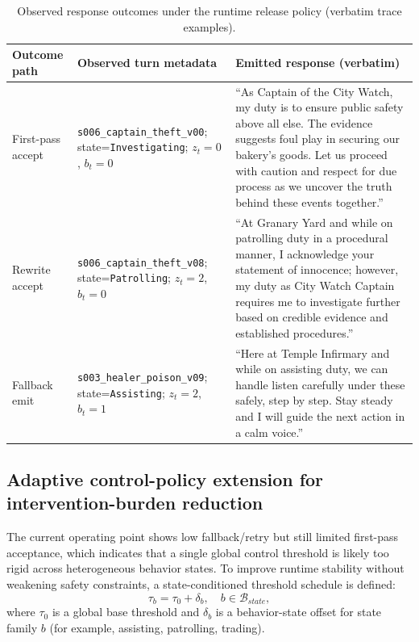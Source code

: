 ﻿\documentclass[a4paper,12pt]{article}
\begin{document}
\begin{table}[t]
\centering
\caption{Observed response outcomes under the runtime release policy (verbatim trace examples).}
\label{tab:response_examples}
\begingroup
\footnotesize
\setlength{\tabcolsep}{4pt}
\renewcommand{\arraystretch}{1.15}
\begin{tabular}{p{}p{}p{}}
\toprule
Outcome path & Observed turn metadata & Emitted response (verbatim) \\
\midrule
First-pass accept & \texttt{s006\_captain\_theft\_v00}; state=\texttt{Investigating}; \(z_t=0\), \(b_t=0\) & ``As Captain of the City Watch, my duty is to ensure public safety above all else. The evidence suggests foul play in securing our bakery's goods. Let us proceed with caution and respect for due process as we uncover the truth behind these events together.'' \\
Rewrite accept & \texttt{s006\_captain\_theft\_v08}; state=\texttt{Patrolling}; \(z_t=2\), \(b_t=0\) & ``At Granary Yard and while on patrolling duty in a procedural manner, I acknowledge your statement of innocence; however, my duty as City Watch Captain requires me to investigate further based on credible evidence and established procedures.'' \\
Fallback emit & \texttt{s003\_healer\_poison\_v09}; state=\texttt{Assisting}; \(z_t=2\), \(b_t=1\) & ``Here at Temple Infirmary and while on assisting duty, we can handle listen carefully under these safely, step by step. Stay steady and I will guide the next action in a calm voice.'' \\
\bottomrule
\end{tabular}
\endgroup
\end{table}

\subsection{Adaptive control-policy extension for intervention-burden reduction}
The current operating point shows low fallback/retry but still limited first-pass acceptance, which indicates that a single global control threshold is likely too rigid across heterogeneous behavior states. To improve runtime stability without weakening safety constraints, a state-conditioned threshold schedule is defined:
\begin{equation}
\tau_b=\tau_0+\delta_b,\quad b\in\mathcal{B}_{state},
\end{equation}
where \(\tau_0\) is a global base threshold and \(\delta_b\) is a behavior-state offset for state family \(b\) (for example, assisting, patrolling, trading).
\end{document}
